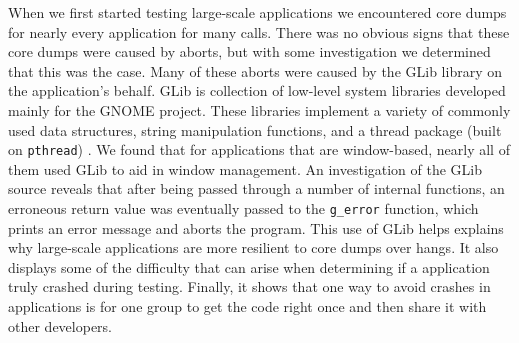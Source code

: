 When we first started testing large-scale applications we encountered core dumps for nearly every application for many calls. There was no obvious signs that these core dumps were caused by aborts, but with some investigation we determined that this was the case. Many of these aborts were caused by the GLib library on the application's behalf. GLib is collection of low-level system libraries developed mainly for the GNOME project. These libraries implement a variety of commonly used data structures, string manipulation functions, and a thread package (built on \texttt{pthread}) \cite{glibman}. We found that for applications that are window-based, nearly all of them used GLib to aid in window management. An investigation of the GLib source \cite{glibsource} reveals that after being passed through a number of internal functions, an erroneous return value was eventually passed to the \texttt{g\_error} function, which prints an error message and aborts the program. This use of GLib helps explains why large-scale applications are more resilient to core dumps over hangs. It also displays some of the difficulty that can arise when determining if a application truly crashed during testing. Finally, it shows that one way to avoid crashes in applications is for one group to get the code right once and then share it with other developers.



